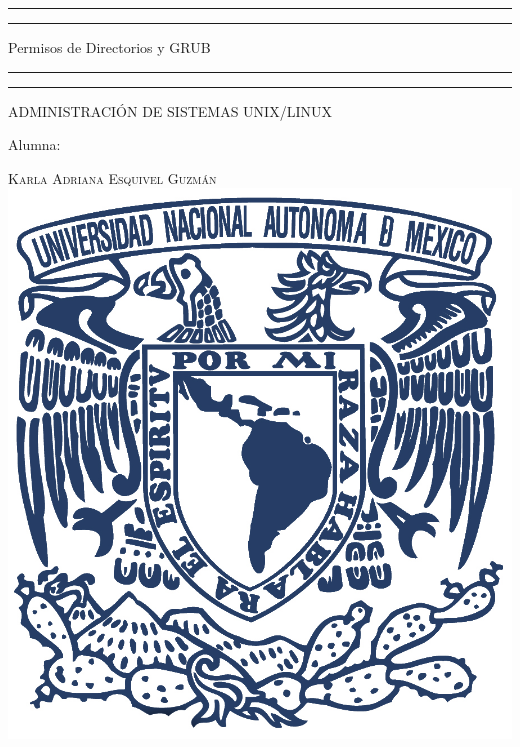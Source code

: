 \documentclass[a4paper, 11pt, oneside]{article}
\begin{document}
 

\begin{titlepage} 

	\centering 
	
	\scshape 
	
	\vspace*{\baselineskip} 
	
	
	
	\rule{\textwidth}{1.6pt}\vspace*{-\baselineskip}\vspace*{2pt} 
	\rule{\textwidth}{0.4pt} 
	
	\vspace{0.75\baselineskip} 
	
	{\LARGE Permisos de Directorios y GRUB}	
	\vspace{0.75\baselineskip} 
	
	\rule{\textwidth}{0.4pt}\vspace*{-\baselineskip}\vspace{3.2pt}
	\rule{\textwidth}{1.6pt} 
	
	\vspace{2\baselineskip} 
	

	ADMINISTRACIÓN DE SISTEMAS UNIX/LINUX
	
	\vspace*{3\baselineskip} 
	
	
	
	Alumna:
	
	\vspace{0.5\baselineskip} 
	
	{\scshape\Large Karla Adriana Esquivel Guzmán \\} 
	\vspace{0.5\baselineskip} 
	\vfill
	\includegraphics{unam.jpg}
	

\end{titlepage}
\end{document}
